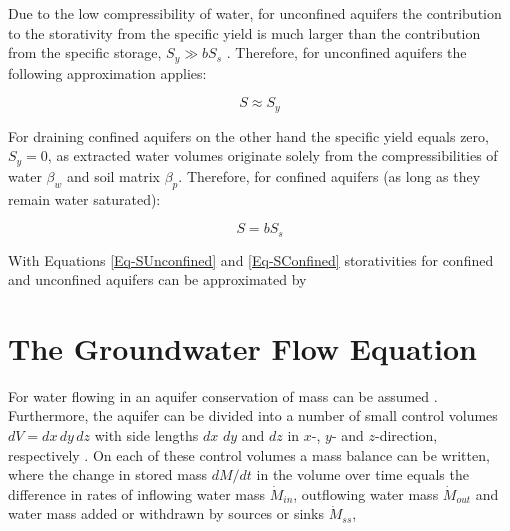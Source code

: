 
Due to the low compressibility of water, for unconfined aquifers the contribution to the storativity from the specific yield is much larger than the contribution from the specific storage, $S_y \gg b S_s$ \parencite{Todd.2005}. 
Therefore, for unconfined aquifers the following approximation applies:

\begin{equation}
    \label{Eq-SUnconfined}
    S \approx S_y
\end{equation}

For draining confined aquifers on the other hand the specific yield equals zero, $S_y = 0$, as extracted water volumes originate solely from the compressibilities of water $\beta_w$ and soil matrix $\beta_p$. 
Therefore, for confined aquifers (as long as they remain water saturated):

\begin{equation}
    \label{Eq-SConfined}
    S = b S_s
\end{equation}

With Equations \eqref{Eq-SUnconfined} and \eqref{Eq-SConfined} storativities for confined and unconfined aquifers can be approximated by



\section{The Groundwater Flow Equation}
\label{Sec-GWFlowEq}

For water flowing in an aquifer conservation of mass can be assumed \parencite{Mays.2005}. 
Furthermore, the aquifer can be divided into a number of small control volumes $dV = dx \, dy \, dz$ with side lengths $dx$ $dy$ and $dz$ in $x$-, $y$- and $z$-direction, respectively \parencite{Fetter.2001}. 
On each of these control volumes a mass balance can be written, where the change in stored mass $dM / dt$ in the volume over time equals the difference in rates of inflowing water mass $\dot{M}_{in}$, outflowing water mass $\dot{M}_{out}$ and water mass added or withdrawn by sources or sinks $\dot{M}_{ss}$,

